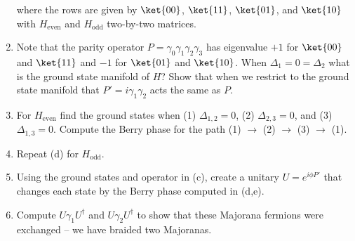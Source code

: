 \documentclass{jhwhw}
\begin{document}
\begin{enumerate}
        where the rows are given by $\ket{00}$, $\ket{11}$, $\ket{01}$, and $\ket{10}$ with $H_{\mathrm{even}}$ and $H_{\mathrm{odd}}$ two-by-two matrices.
  \item Note that the parity operator $P = \gamma_{0} \gamma_{1} \gamma_{2} \gamma_{3}$ has eigenvalue $+1$ for $\ket{00}$ and $\ket{11}$ and $-1$ for $\ket{01}$ and $\ket{10}$. When $\Delta_{1} = 0 = \Delta_{2}$ what is the ground state manifold of $H$? Show that when we restrict to the ground state manifold that $P' = i \gamma_{1} \gamma_{2}$  acts the same as $P$.
  \item For $H_{\mathrm{even}}$ find the ground states when (1) $\Delta_{1,2} = 0$, (2) $\Delta_{2,3} = 0$, and (3) $\Delta_{1,3} = 0$. Compute the Berry phase for the path (1) $\rightarrow$ (2) $\rightarrow$ (3) $\rightarrow$ (1).
  \item Repeat (d) for $H_{\mathrm{odd}}$.
  \item Using the ground states and operator in (c), create a unitary $U = e^{i \phi P'}$ that changes each state by the Berry phase computed in (d,e).
  \item Compute $U\gamma_{1}U^{\dagger}$ and $U \gamma_{2} U^{\dagger}$ to show that these Majorana fermions were exchanged -- we have braided two Majoranas.
\end{enumerate}
\end{document}
